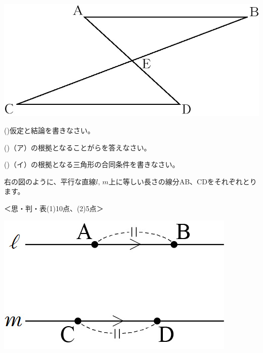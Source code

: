 \documentclass[
  12pt,a4paper,lualatex,ja=standard]{bxjsarticle}
\begin{document}
\begin{flushleft}
\begin{multicols}{2}
\columnbreak

\def\@captype{figure}
\includegraphics{image7.jpg}

\end{multicols}

()\hspace{2.5pt}仮定と結論を書きなさい。

\vspace{15mm}

()\hspace{2.5pt}（ア）の根拠となることがらを答えなさい。

\vspace{15mm}

()\hspace{2.5pt}（イ）の根拠となる三角形の合同条件を書きなさい。

\vspace{15mm}

\setcounter{skaunta}{0}

\vfill

\newpage

\begin{multicols}{2}
\noindent{} \hspace{1pt}右の図のように、平行な直線$l, \, m$上に等しい長さの線分AB、CDをそれぞれとります。

%
\begin{flushright}%
\footnotesize{＜思・判・表(1)10点、(2)5点＞}%
\end{flushright}%


\columnbreak

\def\@captype{figure}
\includegraphics{image15.jpg}


\end{multicols}
\end{flushleft}
\end{document}
